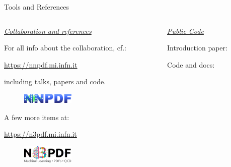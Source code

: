 \documentclass[9pt]{beamer}
\begin{document}
\begin{frame}{Tools and References}
    \begin{columns}
        \begin{column}{0.5\textwidth}
            \uline{{\LARGE\itshape Collaboration and references}}
            \vspace*{15pt}

            For all info about the collaboration, cf.:

            \begin{center}\url{https://nnpdf.mi.infn.it}\end{center}

            including talks, papers and code.

            \vspace*{5pt}
            \begin{figure}
                \centering
                \includegraphics[width=2.5cm]{../_logos/nnpdf_logo.png}
            \end{figure}
            \vspace*{10pt}

            A few more items at:

            \begin{center}\url{https://n3pdf.mi.infn.it}\end{center}

            \vspace*{5pt}
            \begin{figure}
                \centering
                \includegraphics[width=2.5cm]{../_logos/n3pdf_logo.pdf}
            \end{figure}
        \end{column}
        \begin{column}{0.5\textwidth}
            \uline{{\LARGE\itshape Public Code}}
            \vspace*{15pt}

            Introduction paper:\hspace*{10pt}
            \vspace*{10pt}

            Code and docs:
            \vspace*{5pt}


\end{column}
\end{columns}
\end{frame}
\end{document}
